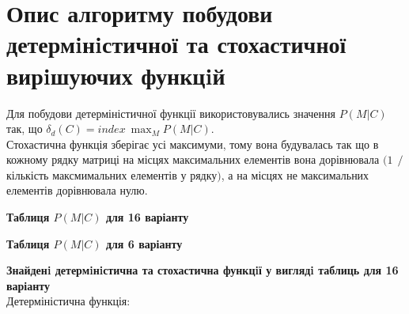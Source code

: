 \section*{Опис алгоритму побудови детермiнiстичної та стохастичної вирiшуючих функцiй}
    
Для побудови детерміністичної функції використовувались значення $P(M|C)$ так, що $ \delta_{d}(C)  = index ~ \displaystyle\max_{M} P(M|C)$.
\\

Стохастична функція зберігає усі максимуми, тому вона будувалась так що в кожному рядку матриці на місцях максимальних елементів вона дорівнювала $(1 ~~ / $ кількість максмимальних елементів у рядку$)$, а на місцях не максимальних елементів дорівнювала нулю.
    
\newpage

\textbf{Таблиця $P(M|C)$ для 16 варіанту }
\begin{figure}[h!]
\label{fig:image}
\end{figure}
    
\textbf{Таблиця $P(M|C)$ для 6 варіанту } 
\begin{figure}[h!]
\label{fig:image}
\end{figure}  
 
\newpage

\textbf{Знайденi детермiнiстична та стохастична функцiї у виглядi таблиць для 16 варіанту}
\\

Детерміністична функція:\\
\begin{figure}[h!]
\label{fig:image}
\end{figure}  
    

